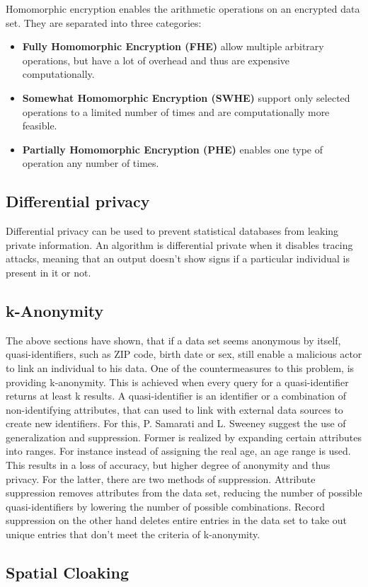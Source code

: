 Homomorphic encryption enables the arithmetic operations on an encrypted data set. They are separated into three categories:
\begin{itemize}
	\item \textbf{Fully Homomorphic Encryption (FHE)} allow multiple arbitrary operations, but have a lot of overhead and thus are expensive computationally.
	\item \textbf{Somewhat Homomorphic Encryption (SWHE)} support only selected operations to a limited number of times and are computationally more feasible.
	\item \textbf{Partially Homomorphic Encryption (PHE)} enables one type of operation any number of times.
\end{itemize}

\subsection{Differential privacy}
Differential privacy can be used to prevent statistical databases from leaking private information. An algorithm is differential private when it disables tracing attacks, meaning that an output doesn't show signs if a particular individual is present in it or not. 

\subsection{k-Anonymity}
The above sections have shown, that if a data set seems anonymous by itself, quasi-identifiers, such as ZIP code, birth date or sex, still enable a malicious actor to link an individual to his data. One of the countermeasures to this problem, is providing k-anonymity. This is achieved when every query for a quasi-identifier returns at least k results. A quasi-identifier is an identifier or a combination of non-identifying attributes, that can used to link with external data sources to create new identifiers. For this, P. Samarati and L. Sweeney suggest the use of generalization and suppression.
Former is realized by expanding certain attributes into ranges. For instance instead of assigning the real age, an age range is used. This results in a loss of accuracy, but higher degree of anonymity and thus privacy. For the latter, there are two methods of suppression. Attribute suppression removes attributes from the data set, reducing the number of possible quasi-identifiers by lowering the number of possible combinations. Record suppression on the other hand deletes entire entries in the data set to take out unique entries that don't meet the criteria of k-anonymity.
\subsection{Spatial Cloaking}
